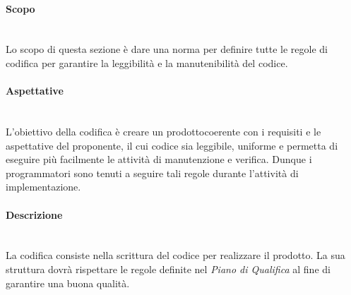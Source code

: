 \paragraph*{Scopo}\mbox{}\\ [1mm]
Lo scopo di questa sezione è dare una norma per definire tutte le regole di codifica per garantire la leggibilità e la manutenibilità del codice.
\paragraph*{Aspettative}\mbox{}\\ [1mm]
L'obiettivo della codifica è creare un prodotto\glosp coerente con i requisiti e le aspettative del proponente, il cui codice sia leggibile, uniforme e permetta di eseguire più facilmente le attività di manutenzione e verifica. Dunque i programmatori sono tenuti a seguire tali regole durante l'attività di implementazione.
\paragraph*{Descrizione}\mbox{}\\ [1mm]
La codifica consiste nella scrittura del codice per realizzare il prodotto\glo. La sua struttura dovrà rispettare le regole definite nel \textit{Piano di Qualifica} al fine di garantire una buona qualità.

